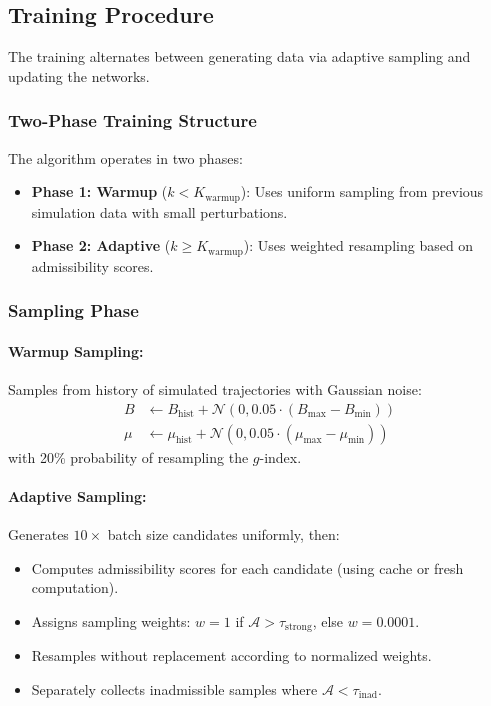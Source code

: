 \subsection{Training Procedure}

The training alternates between generating data via adaptive sampling and updating the networks.

\subsubsection{Two-Phase Training Structure}
The algorithm operates in two phases:
\begin{itemize}
    \item \textbf{Phase 1: Warmup} ($k < K_{\text{warmup}}$): Uses uniform sampling from previous simulation data with small perturbations.
    \item \textbf{Phase 2: Adaptive} ($k \geq K_{\text{warmup}}$): Uses weighted resampling based on admissibility scores.
\end{itemize}

\subsubsection{Sampling Phase}

\paragraph{Warmup Sampling:} Samples from history of simulated trajectories with Gaussian noise:
\begin{align}
    B &\leftarrow B_{\text{hist}} + \mathcal{N}(0, 0.05 \cdot (B_{\max} - B_{\min})) \\
    \mu &\leftarrow \mu_{\text{hist}} + \mathcal{N}(0, 0.05 \cdot (\mu_{\max} - \mu_{\min}))
\end{align}
with 20\% probability of resampling the $g$-index.

\paragraph{Adaptive Sampling:} Generates $10 \times$ batch size candidates uniformly, then:
\begin{itemize}
    \item Computes admissibility scores for each candidate (using cache or fresh computation).
    \item Assigns sampling weights: $w = 1$ if $\mathcal{A} > \tau_{\text{strong}}$, else $w = 0.0001$.
    \item Resamples without replacement according to normalized weights.
    \item Separately collects inadmissible samples where $\mathcal{A} < \tau_{\text{inad}}$.
\end{itemize}

